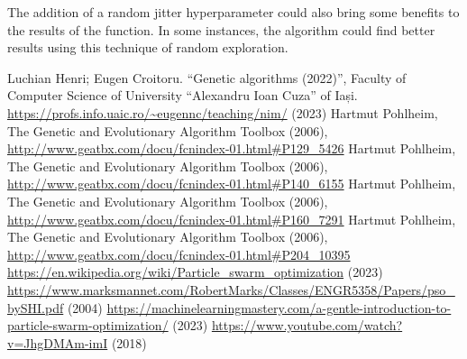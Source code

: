 \documentclass[conference]{IEEEtran}
\begin{document}
The addition of a random jitter hyperparameter could also bring some benefits to the results of the function. In some instances,
the algorithm could find better results using this technique of random exploration.

\begin{thebibliography}{00}
     Luchian Henri; Eugen Croitoru. ``Genetic algorithms (2022)'', Faculty of Computer Science of University ``Alexandru Ioan Cuza'' of Iași.
     \url{https://profs.info.uaic.ro/~eugennc/teaching/nim/} (2023)
     Hartmut Pohlheim, The Genetic and Evolutionary Algorithm Toolbox (2006), \url{http://www.geatbx.com/docu/fcnindex-01.html#P129_5426}
     Hartmut Pohlheim, The Genetic and Evolutionary Algorithm Toolbox (2006), \url{http://www.geatbx.com/docu/fcnindex-01.html#P140_6155}
     Hartmut Pohlheim, The Genetic and Evolutionary Algorithm Toolbox (2006), \url{http://www.geatbx.com/docu/fcnindex-01.html#P160_7291}
     Hartmut Pohlheim, The Genetic and Evolutionary Algorithm Toolbox (2006), \url{http://www.geatbx.com/docu/fcnindex-01.html#P204_10395}
     \url{https://en.wikipedia.org/wiki/Particle_swarm_optimization} (2023)
     \url{https://www.marksmannet.com/RobertMarks/Classes/ENGR5358/Papers/pso_bySHI.pdf} (2004)
     \url{https://machinelearningmastery.com/a-gentle-introduction-to-particle-swarm-optimization/} (2023)
     \url{https://www.youtube.com/watch?v=JhgDMAm-imI} (2018)
\end{thebibliography}
    
\end{document}
